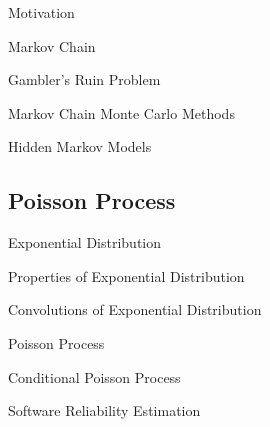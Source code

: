\documentclass{beamer}
\begin{document}
\begin{frame}{Motivation}

\end{frame}

\begin{frame}{Markov Chain}

\end{frame}

\begin{frame}{Gambler's Ruin Problem}

\end{frame}


\begin{frame}{Markov Chain Monte Carlo Methods}

\end{frame}

\begin{frame}{Hidden Markov Models}

\end{frame}



\subsection{Poisson Process} 

\begin{frame}{Exponential Distribution}

\end{frame}

\begin{frame}{Properties of Exponential Distribution}

\end{frame}

\begin{frame}{Convolutions of Exponential Distribution}

\end{frame}

\begin{frame}{Poisson Process}

\end{frame}


\begin{frame}{Conditional Poisson Process}

\end{frame}

\begin{frame}{Software Reliability Estimation}

\end{frame}
\end{document}
